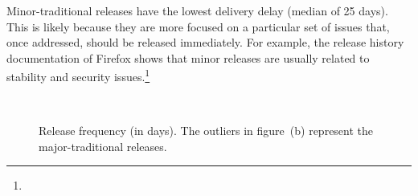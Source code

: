 Minor-traditional releases have the lowest delivery delay (median of 25
days). This is likely because they are more focused on a particular set of
issues that, once addressed, should be released immediately. For example, the
release history documentation of Firefox shows that minor releases are usually
related to stability and security
issues.\DIFdelbegin \footnote{%
}%
\addtocounter{footnote}{-1}%
\DIFdelend \DIFaddbegin {}\DIFaddend \\

\begin{figure}[t!]
	\centering
	\caption{Release frequency (in days). The outliers in figure~(b)
		represent the major-traditional releases.}
	\label{fig:release_length_analysis}
\end{figure}

